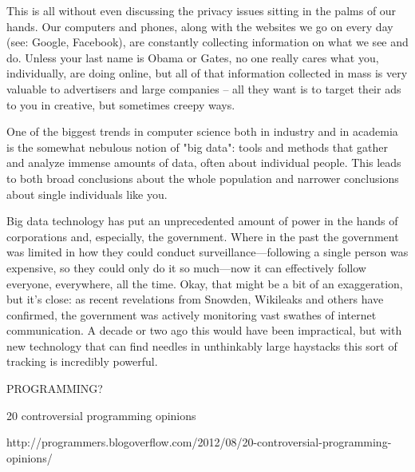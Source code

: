 \documentclass{article}
\begin{document}
This is all without even discussing the privacy issues sitting in the
palms of our hands.  Our computers and phones, along with the websites
we go on every day (see: Google, Facebook), are constantly collecting
information on what we see and do.  Unless your last name is Obama or
Gates, no one really cares what you, individually, are doing online,
but all of that information collected in mass is very valuable to
advertisers and large companies – all they want is to target their ads
to you in creative, but sometimes creepy ways.

One of the biggest trends in computer science both in industry and in
academia is the somewhat nebulous notion of "big data": tools and
methods that gather and analyze immense amounts of data, often about
individual people. This leads to both broad conclusions about the
whole population and narrower conclusions about single individuals
like you.

Big data technology has put an unprecedented amount of power in the
hands of corporations and, especially, the government. Where in the
past the government was limited in how they could conduct
surveillance—following a single person was expensive, so they could
only do it so much—now it can effectively follow everyone, everywhere,
all the time. Okay, that might be a bit of an exaggeration, but it's
close: as recent revelations from Snowden, Wikileaks and others have
confirmed, the government was actively monitoring vast swathes of
internet communication. A decade or two ago this would have been
impractical, but with new technology that can find needles in
unthinkably large haystacks this sort of tracking is incredibly
powerful.

PROGRAMMING?

20 controversial programming opinions

http://programmers.blogoverflow.com/2012/08/20-controversial-programming-opinions/








\end{document}
